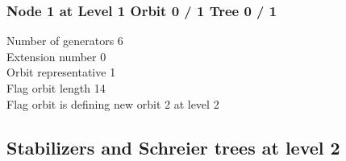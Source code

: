 \subsubsection*{Node 1 at Level 1 Orbit 0 / 1 Tree 0 / 1}
Number of generators 6\\

\noindent Extension number 0\\
Orbit representative 1\\
Flag orbit length 14\\
Flag orbit is defining new orbit 2 at level 2\\

\subsection{Stabilizers and Schreier trees at level 2}

